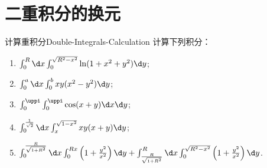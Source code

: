 \section{二重积分的换元}

\begin{problem}{计算重积分}{Double-Integrals-Calculation}
    计算下列积分：
    \begin{enumerate}
        \item $\int_{0}^{R} \d x \int_{0}^{\sqrt{R^2-x^2}} \ln(1 + x^2 + y^2) \d y$;
        \item $\int_{0}^{a} \d x \int_{0}^{b} xy(x^2 - y^2) \d y$;
        \item $\int_{0}^{\uppi} \int_{0}^{\uppi} \cos(x + y) \d x \d y$;
        \item $\int_{0}^{\frac{1}{\sqrt{2}}} \d x \int_{x}^{\sqrt{1 - x^2}} xy(x + y) \d y$;
        \item $\int_{0}^{\frac{R}{\sqrt{1+R^2}}} \d x \int_{0}^{Rx} \left(1 + \frac{y^2}{x^2}\right) \d y + \int_{\frac{R}{\sqrt{1+R^2}}}^{R} \d x \int_{0}^{\sqrt{R^2-x^2}} \left(1 + \frac{y^2}{x^2}\right) \d y$.
    \end{enumerate}
\end{problem}

